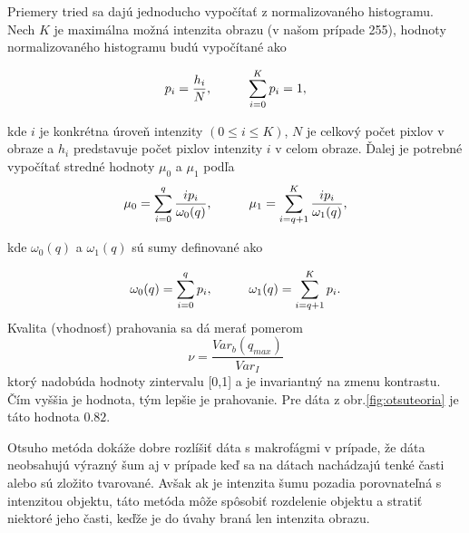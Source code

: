 \documentclass[a4paper,11pt,oneside]{article}%
\begin{document}
Priemery tried sa dajú jednoducho vypočítať z normalizovaného histogramu. Nech $K$ je maximálna možná intenzita obrazu (v našom prípade 255), hodnoty normalizovaného histogramu  budú vypočítané ako

\begin{equation}
p_i = \frac{h_i}{N}, \hspace{10mm}  \sum_{i=0}^{K} p_i = 1,
\end{equation}

kde $i$ je konkrétna úroveň intenzity $(0 \leq i \leq K)$, $N$ je celkový počet pixlov v obraze a $h_i$ predstavuje počet pixlov intenzity $ i $ v celom obraze. Ďalej je potrebné vypočítať stredné hodnoty $\mu_0$ a $\mu_1$ podľa 
\begin{equation}
\mu_0 =  \sum_{i=0}^{q}\frac{i p_i}{\omega_0(q)}, \hspace{10mm} \mu_1 =  \sum_{i=q + 1}^{K}\frac{i p_i}{\omega_1(q)},
\end{equation}

kde $\omega_0(q)$ a $\omega_1(q)$ sú sumy definované ako

\begin{equation}
\omega_0(q) = \sum_{i=0}^{q} p_i, \hspace{10mm} \omega_1(q) =  \sum_{i=q + 1}^{K} p_i.
\end{equation}
Kvalita (vhodnosť) prahovania sa dá merať pomerom
\begin{equation}
\nu  = \frac{Var_b(q_{max})}{Var_I} 
\end{equation}
ktorý nadobúda hodnoty zintervalu [0,1] a je invariantný na zmenu kontrastu. Čím vyššia je hodnota, tým lepšie je prahovanie. Pre dáta z obr.\ref{fig:otsuteoria} je táto hodnota $ 0.82 $.
 

Otsuho metóda dokáže dobre rozlíšiť dáta s makrofágmi v prípade, že dáta neobsahujú výrazný šum aj v prípade keď sa na dátach nachádzajú tenké časti alebo sú zložito tvarované. Avšak ak je intenzita šumu pozadia porovnateľná s intenzitou objektu, táto metóda môže spôsobiť rozdelenie objektu a stratiť niektoré jeho časti, keďže je do úvahy braná len intenzita obrazu.
\end{document}
